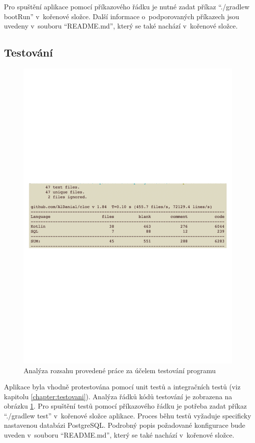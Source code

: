         Pro spuštění aplikace pomocí příkazového řádku je nutné zadat příkaz \enquote{./gradlew bootRun} v~kořenové složce. Další informace o~podporovaných příkazech jsou uvedeny v~souboru \enquote{README.md}, který se také nachází v~kořenové složce. 
        
    \subsection{Testování}
        \begin{figure}\centering
    	   \includegraphics[width=1.0\textwidth]{pdfs/CodeAmountTests2}
    	   \caption[Analýza kódu testů]{Analýza rozsahu provedené práce za účelem testování programu}\label{image:code-count-test}
        \end{figure}
        Aplikace byla vhodně protestována pomocí unit testů a integračních testů (viz kapitolu \ref{chapter:testovani}). Analýza řádků kódů testování je zobrazena na obrázku \ref{image:code-count-test}. Pro spuštění testů pomocí příkazového řádku je potřeba zadat příkaz \enquote{./gradlew test} v~kořenové složce aplikace. Proces běhu testů vyžaduje specificky nastavenou databázi PostgreSQL.
        Podrobný popis požadované konfigurace bude uveden v~souboru \enquote{README.md}, který se také nachází v~kořenové složce.

